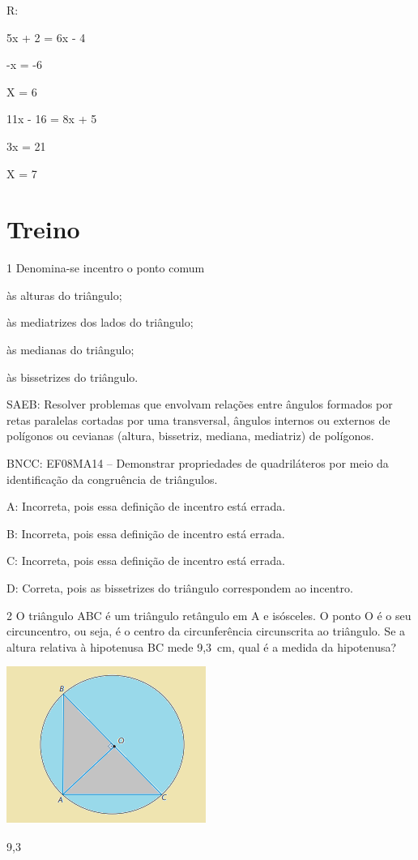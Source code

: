 {R:
\item

5x + 2 = 6x - 4

-x = -6

X = 6
\item

11x - 16 = 8x + 5

3x = 21

X = 7

\section{Treino}

\num{1} Denomina-se incentro o ponto comum
\item às alturas do triângulo;
\item às mediatrizes dos lados do triângulo;
\item às medianas do triângulo;
\item às bissetrizes do triângulo.

SAEB: Resolver problemas que envolvam relações entre ângulos formados
por retas paralelas cortadas por uma transversal, ângulos internos ou
externos de polígonos ou cevianas (altura, bissetriz, mediana,
mediatriz) de polígonos.

BNCC: EF08MA14 -- Demonstrar propriedades de quadriláteros por meio da
identificação da congruência de triângulos.

A: Incorreta, pois essa definição de incentro está errada.

B: Incorreta, pois essa definição de incentro está errada.

C: Incorreta, pois essa definição de incentro está errada.

D: Correta, pois as bissetrizes do triângulo correspondem ao incentro.

\num{2} O triângulo ABC é um triângulo retângulo em A e isósceles. O ponto O
é o seu circuncentro, ou seja, é o centro da circunferência circunscrita
ao triângulo. Se a altura relativa à hipotenusa BC mede 9,3~cm, qual é a
medida da hipotenusa?

\includegraphics[width=2.5625in,height=2.02083in]{./imgSAEB_8_MAT/media/image35.png}
\item 9,3

}
